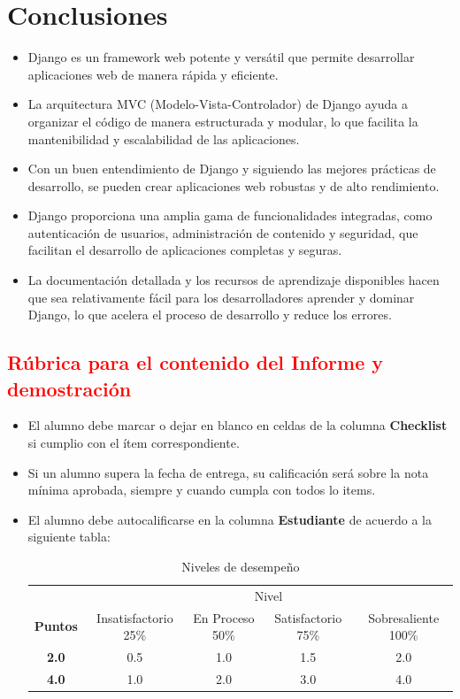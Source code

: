 \documentclass{article}
\begin{document}
  \section{Conclusiones}
  \begin{itemize}
  \item Django es un framework web potente y versátil que permite desarrollar aplicaciones web de manera rápida y eficiente.
  \item La arquitectura MVC (Modelo-Vista-Controlador) de Django ayuda a organizar el código de manera estructurada y modular, 
    lo que facilita la mantenibilidad y escalabilidad de las aplicaciones.
  \item Con un buen entendimiento de Django y siguiendo las mejores prácticas de desarrollo, se pueden crear aplicaciones web 
    robustas y de alto rendimiento.
  \item Django proporciona una amplia gama de funcionalidades integradas, como autenticación de usuarios, administración de contenido 
  y seguridad, que facilitan el desarrollo de aplicaciones completas y seguras.
  \item La documentación detallada y los recursos de aprendizaje disponibles hacen que sea relativamente fácil para los desarrolladores aprender y dominar Django, lo que acelera el proceso de desarrollo y reduce los errores.
  \end{itemize}

	\newpage
	\subsection{\textcolor{red}{Rúbrica para el contenido del Informe y demostración}}
	\begin{itemize}			
		\item El alumno debe marcar o dejar en blanco en celdas de la columna \textbf{Checklist} si cumplio con el ítem correspondiente.
		\item Si un alumno supera la fecha de entrega,  su calificación será sobre la nota mínima aprobada, siempre y cuando cumpla con todos lo items.
		\item El alumno debe autocalificarse en la columna \textbf{Estudiante} de acuerdo a la siguiente tabla:
	
		\begin{table}[ht]
			\caption{Niveles de desempeño}
			\begin{center}
			\begin{tabular}{ccccc}
    			\hline
    			 & \multicolumn{4}{c}{Nivel}\\
    			\cline{1-5}
    			\textbf{Puntos} & Insatisfactorio 25\%& En Proceso 50\% & Satisfactorio 75\% & Sobresaliente 100\%\\
    			\textbf{2.0}&0.5&1.0&1.5&2.0\\
    			\textbf{4.0}&1.0&2.0&3.0&4.0\\
    		\hline
			\end{tabular}
		\end{center}
	\end{table}	
	

	\end{itemize}
\end{document}
